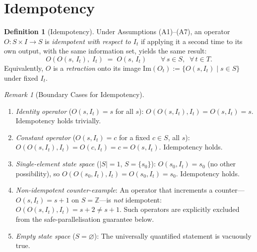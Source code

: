 \documentclass[12pt,openany]{book}
\newcommand{\calI}{\mathcal{I}}
\numberwithin{equation}{chapter}
\theoremstyle{plain}
\theoremstyle{definition}
\newtheorem{definition}[theorem]{Definition}
\theoremstyle{remark}
\newtheorem{remark}[theorem]{Remark}
\numberwithin{equation}{chapter}
\theoremstyle{plain}
\newcommand{\calS}{\mathcal{S}}
\newcommand{\calT}{\mathcal{T}}
\def\calI{I}%
\def\calS{S}%
\def\calT{T}%
\begin{document}
\section{Idempotency}
\label{sec:idempotency}

\begin{definition}[Idempotency]
\label{def:idempotency}
Under Assumptions (A1)--(A7), an operator
$O : \calS \times \calI \to \calS$ is \emph{idempotent with respect to
$\calI_t$} if applying it a second time to its own output, with the
same information set, yields the same result:
\begin{equation}
  O\!\left(O(s,\, \calI_t),\;\calI_t\right)
  \;=\;
  O(s,\, \calI_t)
  \qquad
  \forall\, s \in \calS,\;\; \forall\, t \in \calT.
  \label{eq:idempotent}
\end{equation}
Equivalently, $O$ is a \emph{retraction} onto its image
$\mathrm{Im}(O_t) := \{O(s, \calI_t) \mid s \in \calS\}$ under fixed
$\calI_t$.
\end{definition}

\begin{remark}[Boundary Cases for Idempotency]
\label{rem:idemp-boundary}
\begin{enumerate}
  \item \emph{Identity operator} ($O(s, \calI_t) = s$ for all $s$):
        $O(O(s, \calI_t), \calI_t) = O(s, \calI_t) = s$.
        Idempotency holds trivially.

  \item \emph{Constant operator}
        ($O(s, \calI_t) = c$ for a fixed $c \in \calS$, all $s$):
        $O(O(s, \calI_t), \calI_t) = O(c, \calI_t) = c
         = O(s, \calI_t)$.  Idempotency holds.

  \item \emph{Single-element state space} ($|\calS| = 1$, $\calS =
        \{s_0\}$):
        $O(s_0, \calI_t) = s_0$ (no other possibility), so
        $O(O(s_0, \calI_t), \calI_t) = O(s_0, \calI_t) = s_0$.
        Idempotency holds.

  \item \emph{Non-idempotent counter-example}:
        An operator that increments a counter---$O(s, \calI_t) = s + 1$
        on $\calS = \mathbb{Z}$---is \emph{not} idempotent:
        $O(O(s, \calI_t), \calI_t) = s + 2 \neq s + 1$.  Such
        operators are explicitly excluded from the safe-parallelisation
        guarantee below.

  \item \emph{Empty state space} ($\calS = \varnothing$):
        The universally quantified statement is vacuously true.
\end{enumerate}
\end{remark}
\end{document}
